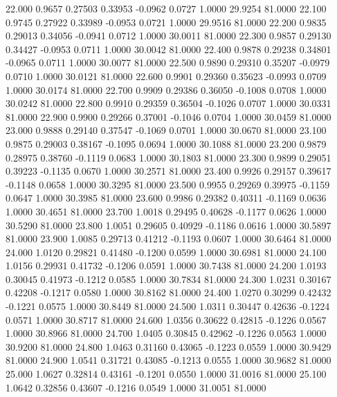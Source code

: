   22.000   0.9657   0.27503   0.33953  -0.0962   0.0727   1.0000  29.9254  81.0000
  22.100   0.9745   0.27922   0.33989  -0.0953   0.0721   1.0000  29.9516  81.0000
  22.200   0.9835   0.29013   0.34056  -0.0941   0.0712   1.0000  30.0011  81.0000
  22.300   0.9857   0.29130   0.34427  -0.0953   0.0711   1.0000  30.0042  81.0000
  22.400   0.9878   0.29238   0.34801  -0.0965   0.0711   1.0000  30.0077  81.0000
  22.500   0.9890   0.29310   0.35207  -0.0979   0.0710   1.0000  30.0121  81.0000
  22.600   0.9901   0.29360   0.35623  -0.0993   0.0709   1.0000  30.0174  81.0000
  22.700   0.9909   0.29386   0.36050  -0.1008   0.0708   1.0000  30.0242  81.0000
  22.800   0.9910   0.29359   0.36504  -0.1026   0.0707   1.0000  30.0331  81.0000
  22.900   0.9900   0.29266   0.37001  -0.1046   0.0704   1.0000  30.0459  81.0000
  23.000   0.9888   0.29140   0.37547  -0.1069   0.0701   1.0000  30.0670  81.0000
  23.100   0.9875   0.29003   0.38167  -0.1095   0.0694   1.0000  30.1088  81.0000
  23.200   0.9879   0.28975   0.38760  -0.1119   0.0683   1.0000  30.1803  81.0000
  23.300   0.9899   0.29051   0.39223  -0.1135   0.0670   1.0000  30.2571  81.0000
  23.400   0.9926   0.29157   0.39617  -0.1148   0.0658   1.0000  30.3295  81.0000
  23.500   0.9955   0.29269   0.39975  -0.1159   0.0647   1.0000  30.3985  81.0000
  23.600   0.9986   0.29382   0.40311  -0.1169   0.0636   1.0000  30.4651  81.0000
  23.700   1.0018   0.29495   0.40628  -0.1177   0.0626   1.0000  30.5290  81.0000
  23.800   1.0051   0.29605   0.40929  -0.1186   0.0616   1.0000  30.5897  81.0000
  23.900   1.0085   0.29713   0.41212  -0.1193   0.0607   1.0000  30.6464  81.0000
  24.000   1.0120   0.29821   0.41480  -0.1200   0.0599   1.0000  30.6981  81.0000
  24.100   1.0156   0.29931   0.41732  -0.1206   0.0591   1.0000  30.7438  81.0000
  24.200   1.0193   0.30045   0.41973  -0.1212   0.0585   1.0000  30.7834  81.0000
  24.300   1.0231   0.30167   0.42208  -0.1217   0.0580   1.0000  30.8162  81.0000
  24.400   1.0270   0.30299   0.42432  -0.1221   0.0575   1.0000  30.8449  81.0000
  24.500   1.0311   0.30447   0.42636  -0.1224   0.0571   1.0000  30.8717  81.0000
  24.600   1.0356   0.30622   0.42815  -0.1226   0.0567   1.0000  30.8966  81.0000
  24.700   1.0405   0.30845   0.42962  -0.1226   0.0563   1.0000  30.9200  81.0000
  24.800   1.0463   0.31160   0.43065  -0.1223   0.0559   1.0000  30.9429  81.0000
  24.900   1.0541   0.31721   0.43085  -0.1213   0.0555   1.0000  30.9682  81.0000
  25.000   1.0627   0.32814   0.43161  -0.1201   0.0550   1.0000  31.0016  81.0000
  25.100   1.0642   0.32856   0.43607  -0.1216   0.0549   1.0000  31.0051  81.0000
